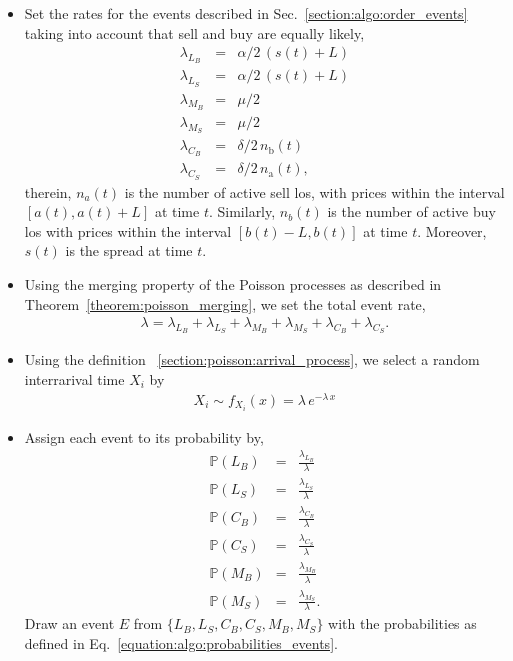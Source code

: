 \documentclass[11pt, a4paper]{thesis}  %
\begin{document}
\begin{itemize}

	\item Set the rates for the events described in Sec.~\ref{section:algo:order_events} taking into 
	account that sell and buy are equally likely, 
	\begin{eqnarray}
		\lambda_{L_B} &=& \alpha/2\,(s(t)+L)
		\\\nonumber	
		\lambda_{L_S} &=& \alpha/2\,(s(t)+L)
		\\\nonumber	
		\lambda_{M_B} &=& \mu/2
		\\\nonumber	
		\lambda_{M_S} &=& \mu/2
		\\\nonumber	
		\lambda_{C_B} &=& \delta/2\,n_\textrm{b}(t)
		\\\nonumber	
		\lambda_{C_S} &=& \delta/2\,n_\textrm{a}(t),
	\end{eqnarray}
	therein, $n_a(t)$ is the number of active sell \acp{lo}, 
	with prices within the interval $[a(t), a(t)+L]$ at time $t$. Similarly, $n_b(t)$ 
	is the number of active buy \acp{lo} with prices within the interval $[b(t)-L, b(t)]$ at time $t$. 
	Moreover, $s(t)$ is the spread at time $t$.
	
	\item Using the merging property of the Poisson processes as described in 
	Theorem~\ref{theorem:poisson_merging}, we set the total event rate,
	\begin{eqnarray}
		\lambda = 
		\lambda_{L_B} + \lambda_{L_S} + 
		\lambda_{M_B} + \lambda_{M_S} + 
		\lambda_{C_B} + \lambda_{C_S}.
	\end{eqnarray}
	
	\item Using the definition ~\ref{section:poisson:arrival_process}, we select a random 
	interrarival time $X_i$ by 
	\begin{eqnarray}
		X_i \sim f_{X_i}(x) = \lambda\,e^{-\lambda\,x}
	\end{eqnarray}

	\item Assign each event to its probability by, 
	\begin{eqnarray}
		\mathbb{P}(L_B) &=& \frac{\lambda_{L_B}}{\lambda}
		\label{equation:algo:probabilities_events}
		\\\nonumber		
		\mathbb{P}(L_S) &=& \frac{\lambda_{L_S}}{\lambda}
		\\\nonumber
		\mathbb{P}(C_B) &=& \frac{\lambda_{C_B}}{\lambda}
		\\\nonumber
		\mathbb{P}(C_S) &=& \frac{\lambda_{C_S}}{\lambda}
		\\\nonumber
		\mathbb{P}(M_B) &=& \frac{\lambda_{M_B}}{\lambda}	
		\\\nonumber
		\mathbb{P}(M_S) &=& \frac{\lambda_{M_S}}{\lambda}.	
	\end{eqnarray}
	Draw an event $E$ from $\lbrace L_B,L_S,C_B,C_S,M_B,M_S\rbrace$ 
	with the probabilities as defined in Eq.~\ref{equation:algo:probabilities_events}. 
	

\end{itemize}
\end{document}
